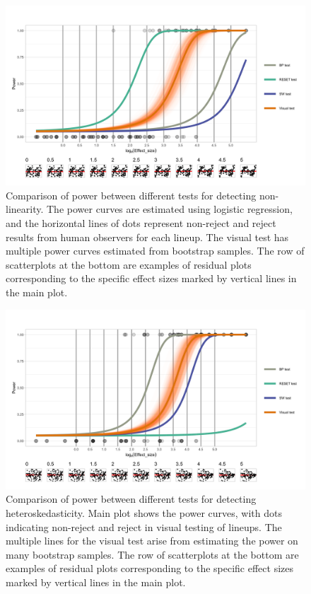 \documentclass[11pt,a4paper,]{article}
\begin{document}
\begin{figure}
\centering
\includegraphics{polypower-1.png}
\caption{Comparison of power between different tests for detecting non-linearity. The power curves are estimated using logistic regression, and the horizontal lines of dots represent non-reject and reject results from human observers for each lineup. The visual test has multiple power curves estimated from bootstrap samples. The row of scatterplots at the bottom are examples of residual plots corresponding to the specific effect sizes marked by vertical lines in the main plot.\label{fig:polypower}}
\end{figure}

\begin{figure}
\centering
\includegraphics{heterpower-1.png}
\caption{Comparison of power between different tests for detecting heteroskedasticity. Main plot shows the power curves, with dots indicating non-reject and reject in visual testing of lineups. The multiple lines for the visual test arise from estimating the power on many bootstrap samples. The row of scatterplots at the bottom are examples of residual plots corresponding to the specific effect sizes marked by vertical lines in the main plot.}
\end{figure}
\end{document}
